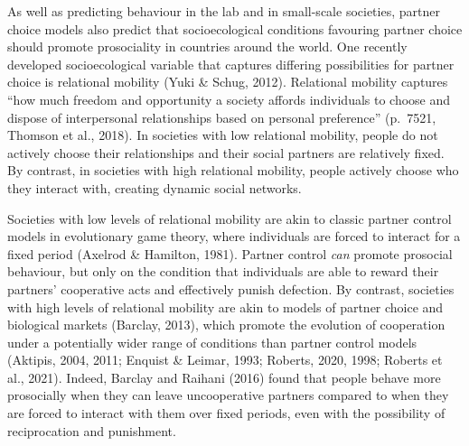 \documentclass[
  man,floatsintext]{apa6}
\begin{document}
As well as predicting behaviour in the lab and in small-scale societies, partner choice models also predict that socioecological conditions favouring partner choice should promote prosociality in countries around the world. One recently developed socioecological variable that captures differing possibilities for partner choice is relational mobility (Yuki \& Schug, 2012). Relational mobility captures ``how much freedom and opportunity a society affords individuals to choose and dispose of interpersonal relationships based on personal preference'' (p.~7521, Thomson et al., 2018). In societies with low relational mobility, people do not actively choose their relationships and their social partners are relatively fixed. By contrast, in societies with high relational mobility, people actively choose who they interact with, creating dynamic social networks.

Societies with low levels of relational mobility are akin to classic partner control models in evolutionary game theory, where individuals are forced to interact for a fixed period (Axelrod \& Hamilton, 1981). Partner control \emph{can} promote prosocial behaviour, but only on the condition that individuals are able to reward their partners' cooperative acts and effectively punish defection. By contrast, societies with high levels of relational mobility are akin to models of partner choice and biological markets (Barclay, 2013), which promote the evolution of cooperation under a potentially wider range of conditions than partner control models (Aktipis, 2004, 2011; Enquist \& Leimar, 1993; Roberts, 2020, 1998; Roberts et al., 2021). Indeed, Barclay and Raihani (2016) found that people behave more prosocially when they can leave uncooperative partners compared to when they are forced to interact with them over fixed periods, even with the possibility of reciprocation and punishment.
\end{document}
